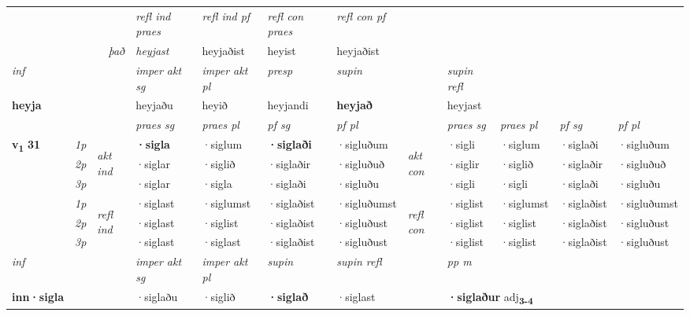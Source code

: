 \begin{longtable}[l]{X>{\footnotesize\itshape}llXXXXlXXXX}
 & && \textit{refl ind praes} & \textit{refl ind pf} & \textit{refl con praes} & \textit{refl con pf} \\*
\multicolumn{3}{r}{\textit{það}}& heyjast & heyjaðist & heyist & heyjaðist \\*

\cmidrule{4-7}
   {\textit{inf}} & &  & \textit{imper akt sg} & \textit{imper akt pl}   & \textit{presp} & \textit{supin} && \textit{supin refl}  \\*
  {\textbf{heyja}} & && heyjaðu  & heyið   & heyjandi &  \textbf{heyjað} && heyjast  \\*

\midrule

 & &   & \textit{praes sg}  & \textit{praes pl}    & \textit{ pf sg} & \textit{pf pl} & & \textit{praes sg}  & \textit{praes pl}    & \textit{pf sg} & \textit{pf pl }  \\ \cmidrule{4-7} \cmidrule{9-12}
 \multirow{2}{*}{{{\textbf{v{\textsubscript{1}}} \Large{\textbf{31}}}}}  & 1p & \multirow{3}{*}{\begin{turn}{90}\textit{akt ind}\end{turn}} & \textbf{·sigla} & ·siglum & \textbf{·siglaði} & ·sigluðum & \multirow{3}{*}{\begin{turn}{90}\textit{akt con}\end{turn}} &·sigli & ·siglum & ·siglaði & ·sigluðum\\*
 & 2p &  &  ·siglar  & ·siglið & ·siglaðir & ·sigluðuð & & ·siglir & ·siglið & ·siglaðir & ·sigluðuð \\*
 & 3p &  & ·siglar & ·sigla & ·siglaði & ·sigluðu & & ·sigli & ·sigli& ·siglaði & ·sigluðu \\*
\cmidrule{4-7} \cmidrule{9-12}
 & 1p & \multirow{3}{*}{\begin{turn}{90}\textit{refl ind}\end{turn}}  & ·siglast & ·siglumst & ·siglaðist & ·sigluðumst & \multirow{3}{*}{\begin{turn}{90}\textit{refl con}\end{turn}}  &·siglist & ·siglumst & ·siglaðist & ·sigluðumst \\*
 & 2p &  & ·siglast & ·siglist & ·siglaðist & ·sigluðust & &·siglist & ·siglist & ·siglaðist & ·sigluðust \\*
 & 3p  & & ·siglast & ·siglast & ·siglaðist & ·sigluðust & & ·siglist & ·siglist& ·siglaðist & ·sigluðust \\*
\cmidrule{4-7} \cmidrule{9-12}

   {\textit{inf}} & &  & \textit{imper akt sg} & \textit{imper akt pl}    & \textit{supin} & \textit{supin refl} && \textit{pp m} \\*
  {\textbf{inn\allowbreak ·sigla}} & && ·siglaðu  & ·siglið    &  \textbf{·siglað} & ·siglast && \multicolumn{2}{l}{\textbf{·siglaður} adj\textbf{\textsubscript{3-4}}} \\*


\end{longtable}

